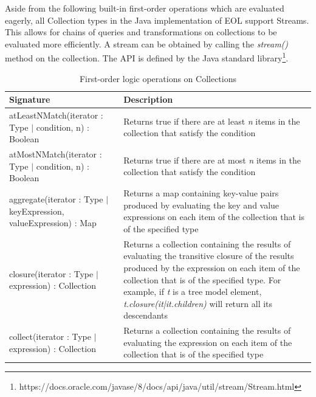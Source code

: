 Aside from the following built-in first-order operations which are evaluated eagerly, all Collection types in the Java implementation of EOL support Streams. This allows for chains of queries and transformations on collections to be evaluated more efficiently. A stream can be obtained by calling the \emph{stream()} method on the collection. The API is defined by the Java standard library\footnote{https://docs.oracle.com/javase/8/docs/api/java/util/stream/Stream.html}.

\begin{longtabu} {|p{6.5cm}|X|}
\caption{First-order logic operations on Collections}
\label{tab:FirstOrderOperations}\\
\hline

    \textbf{Signature} & \textbf{Description} \\\hline

	atLeastNMatch(iterator : Type $|$ condition, n) : Boolean & Returns true if there are at least \emph{n} items in the collection that satisfy the condition \\\hline
	
	atMostNMatch(iterator : Type $|$ condition, n) : Boolean & Returns true if there are at most \emph{n} items in the collection that satisfy the condition \\\hline

    aggregate(iterator : Type $|$ keyExpression, valueExpression) : Map & Returns a map containing key-value pairs produced by evaluating the key and value expressions on each item of the collection that is of the specified type \\\hline
    
    closure(iterator : Type $|$ expression) : Collection & Returns a collection containing the results of evaluating the transitive closure of the results produced by the expression on each item of the collection that is of the specified type. For example, if \emph{t} is a tree model element, \emph{t.closure(it|it.children)} will return all its descendants \\\hline
    
    collect(iterator : Type $|$ expression) : Collection &  Returns a collection containing the results of evaluating the expression on each item of the collection that is of the specified type \\\hline
    

\end{longtabu}
